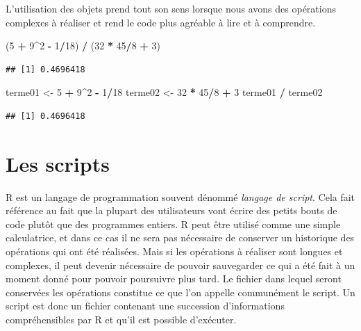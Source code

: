 \documentclass[
]{book}
\newenvironment{Shaded}{\begin{snugshade}}{\end{snugshade}}
\newcommand{\DecValTok}[1]{\textcolor[rgb]{0.00,0.00,0.81}{#1}}
\newcommand{\NormalTok}[1]{#1}
\newcommand{\OperatorTok}[1]{\textcolor[rgb]{0.81,0.36,0.00}{\textbf{#1}}}
\newcommand{\StringTok}[1]{\textcolor[rgb]{0.31,0.60,0.02}{#1}}
\begin{document}
L'utilisation des objets prend tout son sens lorsque nous avons des opérations complexes à réaliser et rend le code plus agréable à lire et à comprendre.

\begin{Shaded}
\begin{Highlighting}[]
\NormalTok{(}\DecValTok{5} \OperatorTok{+}\StringTok{ }\DecValTok{9}\OperatorTok{^}\DecValTok{2} \OperatorTok{-}\StringTok{ }\DecValTok{1}\OperatorTok{/}\DecValTok{18}\NormalTok{) }\OperatorTok{/}\StringTok{ }\NormalTok{(}\DecValTok{32} \OperatorTok{*}\StringTok{ }\DecValTok{45}\OperatorTok{/}\DecValTok{8} \OperatorTok{+}\StringTok{ }\DecValTok{3}\NormalTok{)}
\end{Highlighting}
\end{Shaded}

\begin{verbatim}
## [1] 0.4696418
\end{verbatim}

\begin{Shaded}
\begin{Highlighting}[]
\NormalTok{terme01 <-}\StringTok{ }\DecValTok{5} \OperatorTok{+}\StringTok{ }\DecValTok{9}\OperatorTok{^}\DecValTok{2} \OperatorTok{-}\StringTok{ }\DecValTok{1}\OperatorTok{/}\DecValTok{18}
\NormalTok{terme02 <-}\StringTok{ }\DecValTok{32} \OperatorTok{*}\StringTok{ }\DecValTok{45}\OperatorTok{/}\DecValTok{8} \OperatorTok{+}\StringTok{ }\DecValTok{3}
\NormalTok{terme01 }\OperatorTok{/}\StringTok{ }\NormalTok{terme02}
\end{Highlighting}
\end{Shaded}

\begin{verbatim}
## [1] 0.4696418
\end{verbatim}

\hypertarget{les-scripts}{%
\section{Les scripts}\label{les-scripts}}

R est un langage de programmation souvent dénommé \emph{langage de script}. Cela fait référence au fait que la plupart des utilisateurs vont écrire des petits bouts de code plutôt que des programmes entiers. R peut être utilisé comme une simple calculatrice, et dans ce cas il ne sera pas nécessaire de conserver un historique des opérations qui ont été réalisées. Mais si les opérations à réaliser sont longues et complexes, il peut devenir nécessaire de pouvoir sauvegarder ce qui a été fait à un moment donné pour pouvoir poursuivre plus tard. Le fichier dans lequel seront conservées les opérations constitue ce que l'on appelle communément le script. Un script est donc un fichier contenant une succession d'informations compréhensibles par R et qu'il est possible d'exécuter.
\end{document}
